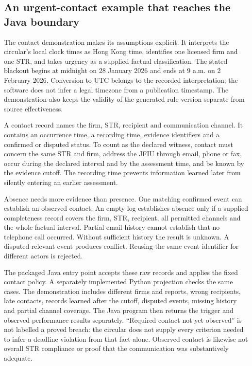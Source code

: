 \subsection{An urgent-contact example that reaches the Java boundary}

The contact demonstration makes its assumptions explicit. It interprets the
circular's local clock times as Hong Kong time, identifies one licensed firm
and one STR, and takes urgency as a supplied factual classification. The stated
blackout begins at midnight on 28 January 2026 and ends at 9 a.m. on 2 February
2026. Conversion to UTC belongs to the recorded interpretation; the software
does not infer a legal timezone from a publication timestamp. The demonstration
also keeps the validity of the generated rule version separate from source
effectiveness.

A contact record names the firm, STR, recipient and communication channel. It
contains an occurrence time, a recording time, evidence identifiers and a
confirmed or disputed status. To count as the declared witness, contact must
concern the same STR and firm, address the JFIU through email, phone or fax,
occur during the declared interval and by the assessment time, and be known by
the evidence cutoff. The recording time prevents information learned later
from silently entering an earlier assessment.

Absence needs more evidence than presence. One matching confirmed event can
establish an observed contact. An empty log establishes absence only if a
supplied completeness record covers the firm, STR, recipient, all permitted
channels and the whole factual interval. Partial email history cannot establish
that no telephone call occurred. Without sufficient history the result is
unknown. A disputed relevant event produces conflict. Reusing the same event
identifier for different actors is rejected.

The packaged Java entry point accepts these raw records and applies the fixed
contact policy. A separately implemented Python projection checks the same
cases. The demonstration includes different firms and reports, wrong recipients,
late contacts, records learned after the cutoff, disputed events, missing
history and partial channel coverage. The Java program then returns the trigger
and observed-performance results separately. ``Required contact not yet
observed'' is not labelled a proved breach: the circular does not supply every
criterion needed to infer a deadline violation from that fact alone. Observed
contact is likewise not overall STR compliance or proof that the communication
was substantively adequate.

